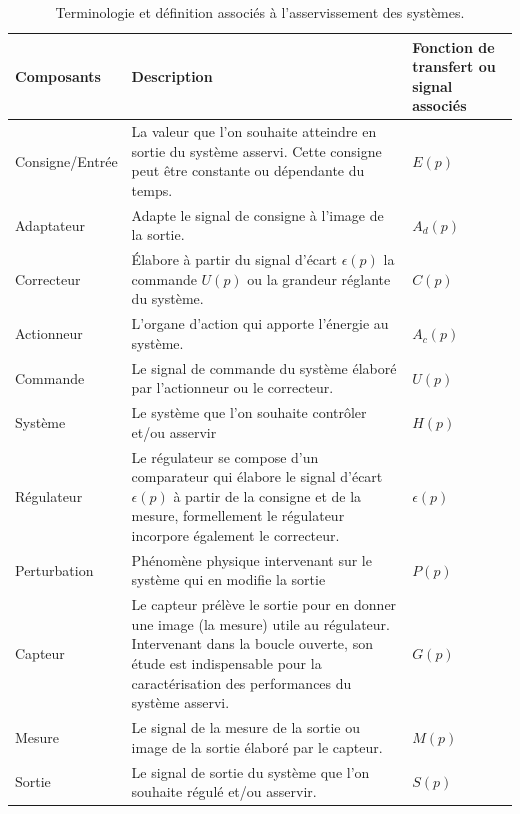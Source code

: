 \begin{table}[!h]
    \centering
    \begin{tabular}{@{}P{3cm}m{8.5cm}P{3cm}@{}}
    \toprule
Composants      & Description & Fonction de transfert ou signal associés\\
    \midrule
Consigne/Entrée & La valeur que l'on souhaite atteindre en sortie 
                  du système asservi. Cette consigne peut être constante 
                  ou dépendante du temps. 
                & $E(p)$                                                \\
Adaptateur      & Adapte le signal de consigne à l'image de la sortie.
                & $A_d(p)$                                              \\
Correcteur      & \'Elabore à partir du signal d'écart $\epsilon(p)$ 
                  la commande $U(p)$ ou la grandeur réglante du système.
                & $C(p)$                                                \\
Actionneur      & L'organe d'action qui apporte l'énergie au système.
                & $A_c(p)$                                              \\
Commande        & Le signal de commande du système élaboré par l'actionneur 
		                  ou le correcteur.
                & $U(p)$                                                \\
Système         & Le système que l'on souhaite contrôler et/ou asservir
                & $H(p)$                                                \\
Régulateur      & Le régulateur se compose d'un comparateur qui élabore le 
                  signal d'écart $\epsilon(p)$ à partir de la consigne et de 
                  la mesure, formellement le régulateur incorpore 
                  également le correcteur.
                & $\epsilon(p)$                                         \\
Perturbation    & Phénomène physique intervenant sur le système qui 
                  en modifie la sortie
                & $P(p)$                                                \\
Capteur         &  Le capteur prélève le sortie pour en donner une 
                   image (la mesure) utile au régulateur. 
                   Intervenant dans la boucle ouverte, son étude 
                   est indispensable pour la caractérisation des 
                   performances du système asservi.
                & $G(p)$                                                \\
Mesure          & Le signal de la mesure de la sortie ou image de la sortie
                  élaboré par le capteur.
                & $M(p)$                                                \\
Sortie          & Le signal de sortie du système que l'on souhaite 
                  régulé et/ou asservir.
                & $S(p)$                                                \\
        \bottomrule
    \end{tabular}
    \caption{Terminologie et définition associés à l'asservissement des 
             systèmes.\label{tab-asser}}
\end{table}
